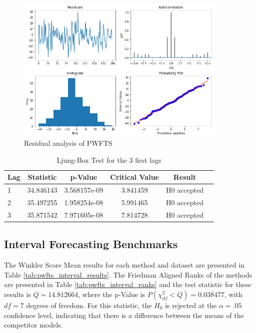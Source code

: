 \begin{figure}[htb]
    \centering
    \includegraphics[width=\textwidth,height=7cm]{figures/pwfts_residual.png}
    \caption{Residual analysis of PWFTS}
    \label{fig:pwfts_residual}
\end{figure}

\begin{table}[htb]
    \centering
\begin{tabular}{|l|c|c|c|c|l|}
\hline
\textbf{Lag} &  \textbf{Statistic} & \textbf{p-Value} &  \textbf{Critical Value} &       \textbf{Result} \\
\hline
1 &  34.846143 &  3.568157e-09 &        3.841459 &  H0 accepted \\
2 &  35.497255 &  1.958254e-08 &        5.991465 &  H0 accepted \\
3 &  35.871542 &  7.971605e-08 &        7.814728 &  H0 accepted \\
\hline
\end{tabular}
    \caption{Ljung-Box Test for the 3 first lags}
    \label{tab:pwfts_residual}
\end{table}

\subsection{Interval Forecasting Benchmarks}
\label{sec:pwfts_experiments_interval}

The Winkler Score Mean results for each method and dataset are presented in Table \ref{tab:pwfts_interval_results}. The Friedman Aligned Ranks of the methods are presented in Table \ref{tab:pwfts_interval_ranks} and the test statistic for these results is $Q = 14.812664$, where the p-Value is $P(\chi^2_{df} < Q) = 0.038477$, with $df=7$ degrees of freedom. For this statistic, the $H_0$ is rejected at the $\alpha=.05$ confidence level, indicating that there is a difference between the means of the competitor models.

